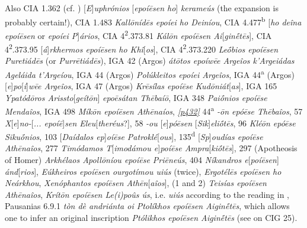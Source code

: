 Also CIA 1.362 (cf. \citealp[144]{Studniczka1887}) {[}\textit{E}{]}\textit{uphrónios }{[}\textit{\emph{epoíēsen} ho}{]} \textit{kerameús} (the expansion is probably certain!), CIA 1.483 \textit{Kallōnídēs \emph{epoíei} ho Deiníou}, CIA 4.477\textsuperscript{b} {[}\textit{ho deîna \emph{epoíēsen}} or \textit{\emph{epoíei} P}{]}\textit{ários}, CIA 4\textsuperscript{2}.373.81 \textit{Kálōn \emph{epoíēsen} Ai}{[}\textit{ginḗtēs}{]}, CIA 4\textsuperscript{2}.373.95 {[}\textit{á}{]}\textit{rkhermos \emph{epoíēsen} ho Khî}{[}\textit{os}{]}, CIA 4\textsuperscript{2}.373.220 \textit{Leṓbios \emph{epoíēsen} Puretiádēs} (or \textit{Purrētiádēs}), IGA 42 (Argos) \textit{átōtos \emph{epoíwēe} Argeîos k'Argeiádas Ageláida t'Argeíou}, IGA 44 (Argos) \textit{Polúkleitos \emph{epoíei} Argeîos}, IGA 44\textsuperscript{a} (Argos) {[}\textit{\emph{e}}{]}\textit{\emph{po}}{[}\textit{\emph{í}}{]}\textit{\emph{wēe} Argeîos}, IGA 47 (Argos) \textit{Krēsílas \emph{epoíēse} Kudōniát}{[}\textit{as}{]}, IGA 165 \textit{Ypatódōros Arissto}{[}\textit{geítōn}{]}\textit{ \emph{epoēsátan} Thēbaíō}, IGA 348 \textit{Paiṓnios \emph{epoíēse} Mendaîos}, IGA 498 \textit{Míkōn \emph{epoíēsen} Athēnaíos}, \citet{Loewy1885} \hyperlink{p432}{\emph{[p432]}} 44\textsuperscript{a} \textit{-ōn \emph{epóēse} Thēbaîos}, 57 \textit{X}{[}\textit{e}{]}\textit{no-}{[}\textit{... \emph{epoíē}}{]}\textit{\emph{sen} Eleu}{[}\textit{theréus}{?]}, 58 \textit{-ou }{[}\textit{\emph{e}}{]}\textit{\emph{póēsen} }{[}\textit{Sik}{]}\textit{eliṓtēs}, 96 \textit{Kléōn \emph{epóēse} Sikuṓnios}, 103 {[}\textit{Daídalos \emph{ep}}{]}\textit{\emph{oíēse} Patroklé}{[}\textit{ous}{]}, 135\textsuperscript{d} \citep[388]{Loewy1885} {[}\textit{Sp}{]}\textit{oudías \emph{epoíēse} Athēnaîos}, 277 \textit{Timódamos T}{[}\textit{imodámou \emph{e}}{]}\textit{\emph{poíēse} Ampra}{[}\textit{kiṓtēs}{]}\label{Loewy277}, 297 (Apotheosis of Homer) \textit{Arkhélaos Apollōníou \emph{epoíēse} Priēneús}, 404 \textit{Níkandros e}{[}\textit{poíēsen}{]} \textit{ánd}{[}\textit{rios}{]}, \citet[72]{Klein1887} \textit{Eúkheiros \emph{epoíēsen} ourgotímou uiús} (twice), \citet[73]{Klein1887} \textit{Ergotélēs \emph{epoíēsen} ho Neárkhou}, \citet[202]{Klein1887} \textit{Xenóphantos \emph{epoíēsen} Athēn}{[}\textit{aîos}{]}, \citet[202]{Klein1887} (1 and 2) \textit{Teisías \emph{epoíēsen} Athēnaîos}, \citet[213]{Klein1887} \textit{Krítōn \emph{epoíēsen} Le(i)poûs ús}, i.e. \textit{uiús} according to the reading in \citet[144]{Studniczka1887}, Pausanias 6.9.1 \textit{tòn dè andriánta oi Ptolíkhos \emph{epoíēsen} Aiginḗtēs}, which allows one to infer an original inscription \textit{Ptólikhos \emph{epoíēsen} Aiginḗtēs} (see \citealp[41--42]{Boeckh1828} on CIG 25).

